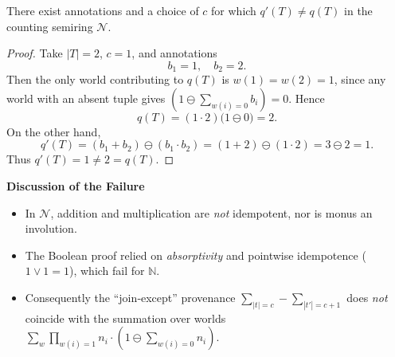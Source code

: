 \begin{proposition}
There exist annotations and a choice of \(c\) for which
\(q'(T)\neq q(T)\)
in the counting semiring \(\mathcal{N}\).
\end{proposition}

\begin{proof}
Take \(\lvert T\rvert=2\), \(c=1\), and annotations
\[
  b_1 = 1,\quad b_2 = 2.
\]
Then the only world contributing to \(q(T)\) is \(w(1)=w(2)=1\), since any world with an absent tuple gives
\((1\ominus\sum_{w(i)=0}b_i)=0\).  Hence
\[
  q(T)
  = (1\cdot2)\bigl(1\ominus0\bigr)
  = 2.
\]
On the other hand,
\[
  q'(T)
  = (b_1+b_2)\ominus(b_1\cdot b_2)
  = (1+2)\ominus(1\cdot2)
  = 3\ominus2
  = 1.
\]
Thus \(q'(T)=1\neq2=q(T)\).
\end{proof}

\bigskip
\noindent\textbf{Discussion of the Failure}

\begin{itemize}
  \item In \(\mathcal{N}\), addition and multiplication are \emph{not} idempotent, nor is monus an involution.
  \item The Boolean proof relied on \emph{absorptivity} and pointwise idempotence (\(1\vee1=1\)), which fail for \(\mathbb{N}\).
  \item Consequently the “join‐except” provenance
    \(\sum_{|t|=c}-\sum_{|t'|=c+1}\)
    does \emph{not} coincide with the summation over worlds
    \(\sum_{w}\prod_{w(i)=1}n_i\cdot(1\ominus\sum_{w(i)=0}n_i)\).
\end{itemize}




